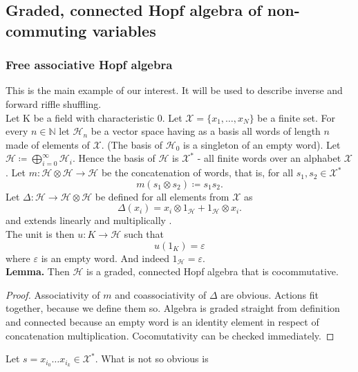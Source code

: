 \documentclass[a4paper, 12pt]{article}
\begin{document}
\subsection{Graded, connected Hopf algebra of non-commuting variables}
\subsubsection{Free associative Hopf algebra}
This is the main example of our interest. It will be used to describe inverse and forward riffle shuffling.\\
Let K be a field with characteristic 0.
Let $\mathcal{X} = \{x_1, \dots, x_N\}$ be a finite set. For every $n \in \mathbb{N}$ let
$\mathcal{H}_n$ be a vector space having as a basis all words of length $n$ made of elements
of $\mathcal{X}$. (The basis of $\mathcal{H}_0$ is a singleton of an empty word).
Let $\mathcal{H} \coloneqq \displaystyle\bigoplus^{\infty}_{i = 0} \mathcal{H}_i$. Hence
the basis of $\mathcal{H}$ is $\mathcal{X}^*$ - all finite words over an alphabet $\mathcal{X}$.
Let $m : \mathcal{H} \otimes \mathcal{H} \to \mathcal{H}$ be the concatenation of words,
that is, for all $s_1, s_2 \in \mathcal{X}^*$
\begin{equation*}
m(s_1 \otimes s_2) \coloneqq s_1s_2.
\end{equation*}
Let $\Delta : \mathcal{H} \to \mathcal{H} \otimes \mathcal{H}$ be defined for all elements from
$\mathcal{X}$ as
\begin{equation*}
\Delta(x_i) = x_i \otimes 1_\mathcal{H} + 1_\mathcal{H} \otimes x_i.
\end{equation*}
and extends linearly and multiplically .\\
The unit is then $u : K \to \mathcal{H}$ such that
\begin{equation*}
u(1_K) = \varepsilon
\end{equation*}
where $\varepsilon$ is an empty word. And indeed $1_\mathcal{H} = \varepsilon$. \\
\textbf{Lemma. } Then $\mathcal{H}$ is a graded, connected Hopf algebra that is cocommutative.
\begin{proof}
Associativity of $m$ and coassociativity of $\Delta$ are obvious. Actions fit together,
because we define them so. Algebra is graded straight from definition and connected because an empty word
is an identity element in respect of concatenation multiplication. Cocomutativity can be checked immediately.
\end{proof}
\noindent Let $s = x_{i_0}\dots x_{i_k} \in \mathcal{X}^*$. What is not so obvious is
\end{document}
